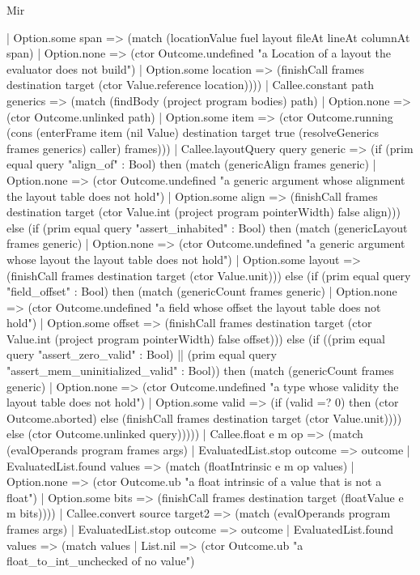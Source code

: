 \begin{lexlean}{Mir}
\begin{semanticmodule}
{      | Option.some span => (match (locationValue fuel layout fileAt lineAt columnAt span)
        | Option.none => (ctor Outcome.undefined "a Location of a layout the evaluator does not build")
        | Option.some location => (finishCall frames destination target (ctor Value.reference location))))
    | Callee.constant path generics => (match (findBody (project program bodies) path)
      | Option.none => (ctor Outcome.unlinked path)
      | Option.some item => (ctor Outcome.running (cons (enterFrame item (nil Value) destination target true (resolveGenerics frames generics) caller) frames)))
    | Callee.layoutQuery query generic => (if (prim equal query "align_of" : Bool) then (match (genericAlign frames generic)
      | Option.none => (ctor Outcome.undefined "a generic argument whose alignment the layout table does not hold")
      | Option.some align => (finishCall frames destination target (ctor Value.int (project program pointerWidth) false align))) else (if (prim equal query "assert_inhabited" : Bool) then (match (genericLayout frames generic)
      | Option.none => (ctor Outcome.undefined "a generic argument whose layout the layout table does not hold")
      | Option.some layout => (finishCall frames destination target (ctor Value.unit))) else (if (prim equal query "field_offset" : Bool) then (match (genericCount frames generic)
      | Option.none => (ctor Outcome.undefined "a field whose offset the layout table does not hold")
      | Option.some offset => (finishCall frames destination target (ctor Value.int (project program pointerWidth) false offset))) else (if ((prim equal query "assert_zero_valid" : Bool) || (prim equal query "assert_mem_uninitialized_valid" : Bool)) then (match (genericCount frames generic)
      | Option.none => (ctor Outcome.undefined "a type whose validity the layout table does not hold")
      | Option.some valid => (if (valid =? 0) then (ctor Outcome.aborted) else (finishCall frames destination target (ctor Value.unit)))) else (ctor Outcome.unlinked query)))))
    | Callee.float e m op => (match (evalOperands program frames args)
      | EvaluatedList.stop outcome => outcome
      | EvaluatedList.found values => (match (floatIntrinsic e m op values)
        | Option.none => (ctor Outcome.ub "a float intrinsic of a value that is not a float")
        | Option.some bits => (finishCall frames destination target (floatValue e m bits))))
    | Callee.convert source target2 => (match (evalOperands program frames args)
      | EvaluatedList.stop outcome => outcome
      | EvaluatedList.found values => (match values
        | List.nil => (ctor Outcome.ub "a float_to_int_unchecked of no value")
}
\end{semanticmodule}
\end{lexlean}
